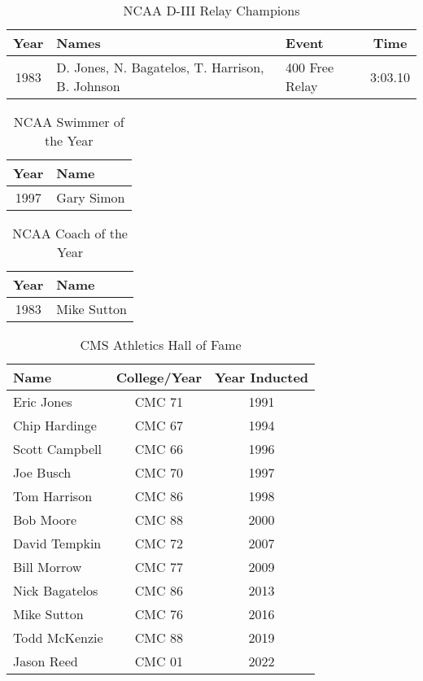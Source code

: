 \begin{table}[htbp]
\centering
\small
\caption*{NCAA D-III Relay Champions}
\begin{tabular}{c l l c}
\toprule
Year & Names & Event & Time \\
\midrule
1983 & D. Jones, N. Bagatelos, T. Harrison, B. Johnson & 400 Free Relay & 3:03.10 \\
\bottomrule
\end{tabular}
\end{table}

\begin{table}[htbp]
\centering
\small
\caption*{NCAA Swimmer of the Year}
\begin{tabular}{c l}
\toprule
Year & Name \\
\midrule
1997 & Gary Simon \\
\bottomrule
\end{tabular}
\end{table}

\begin{table}[htbp]
\centering
\small
\caption*{NCAA Coach of the Year}
\begin{tabular}{c l}
\toprule
Year & Name \\
\midrule
1983 & Mike Sutton \\
\bottomrule
\end{tabular}
\end{table}

\begin{table}[htbp]
\centering
\small
\caption*{CMS Athletics Hall of Fame}
\begin{tabular}{l c c}
\toprule
Name & College/Year & Year Inducted \\
\midrule
Eric Jones & CMC 71 & 1991 \\
Chip Hardinge & CMC 67 & 1994 \\
Scott Campbell & CMC 66 & 1996 \\
Joe Busch & CMC 70 & 1997 \\
Tom Harrison & CMC 86 & 1998 \\
Bob Moore & CMC 88 & 2000 \\
David Tempkin & CMC 72 & 2007 \\
Bill Morrow & CMC 77 & 2009 \\
Nick Bagatelos & CMC 86 & 2013 \\
Mike Sutton & CMC 76 & 2016 \\
Todd McKenzie & CMC 88 & 2019 \\
Jason Reed & CMC 01 & 2022 \\
\bottomrule
\end{tabular}
\end{table}

